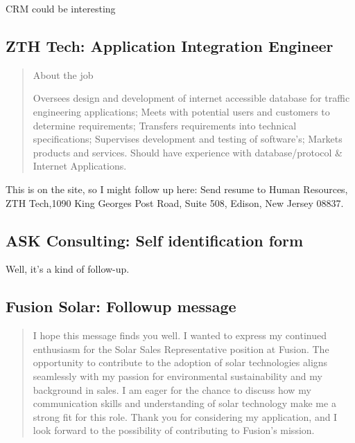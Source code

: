 \documentclass[
	letterpaper, %
	12pt, %
]{CSSullivanBusinessReport}
\begin{document}
CRM could be interesting


\subsection[ZTH Tech]{ZTH Tech: Application Integration Engineer}

\begin{quote}
	About the job
	
	Oversees design and development of internet accessible database for traffic engineering applications; Meets with potential users and customers to determine requirements; Transfers requirements into technical specifications; Supervises development and testing of software's; Markets products and services. Should have experience with database/protocol \& Internet Applications. 

\end{quote}

This is on the site, so I might follow up here: Send resume to Human Resources, ZTH Tech,1090 King Georges Post Road, Suite 508, Edison, New Jersey 08837.



\subsection[ASK Consulting]{ASK Consulting: Self identification form}

Well, it's a kind of follow-up.


\subsection[Fusion Solar]{Fusion Solar: Followup message}

\begin{quote}
	I hope this message finds you well. I wanted to express my continued enthusiasm for the Solar Sales Representative position at Fusion. The opportunity to contribute to the adoption of solar technologies aligns seamlessly with my passion for environmental sustainability and my background in sales. I am eager for the chance to discuss how my communication skills and understanding of solar technology make me a strong fit for this role. Thank you for considering my application, and I look forward to the possibility of contributing to Fusion's mission.
\end{quote}
\end{document}
